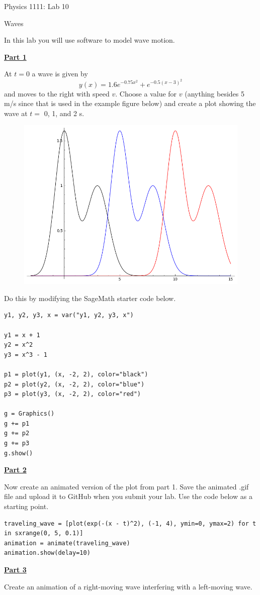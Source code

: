 \documentclass[12pt]{article}
\begin{document}
{\centering
\large Physics 1111: Lab 10 \par
\large Waves \par
}
\hfill \break \vspace{-4mm}

In this lab you will use software to model wave motion.
\hfill \break

\underline{\textbf{Part 1}} \par
At $t = 0$ a wave is given by
\begin{equation}
y(x) = 1.6e^{-0.75x^2} + e^{-0.5(x-3)^2}
\end{equation}
and moves to the right with speed $v$.
Choose a value for $v$ (anything besides 5 m/s since that is used in the example figure below) and create a plot showing the wave at $t =$ 0, 1, and 2 s.
\begin{figure}[H]
\includegraphics[scale=0.50]{figures/fig1.png}
\end{figure}
Do this by modifying the SageMath starter code below.
\begin{verbatim}
y1, y2, y3, x = var("y1, y2, y3, x")

y1 = x + 1
y2 = x^2
y3 = x^3 - 1

p1 = plot(y1, (x, -2, 2), color="black")
p2 = plot(y2, (x, -2, 2), color="blue")
p3 = plot(y3, (x, -2, 2), color="red")

g = Graphics()
g += p1
g += p2
g += p3
g.show()
\end{verbatim}

\underline{\textbf{Part 2}} \par
Now create an animated version of the plot from part 1.
Save the animated .gif file and upload it to GitHub when you submit your lab.
Use the code below as a starting point.
\begin{verbatim}
traveling_wave = [plot(exp(-(x - t)^2), (-1, 4), ymin=0, ymax=2) for t in sxrange(0, 5, 0.1)]
animation = animate(traveling_wave)
animation.show(delay=10)
\end{verbatim}

\underline{\textbf{Part 3}} \par
Create an animation of a right-moving wave interfering with a left-moving wave.
\end{document}
